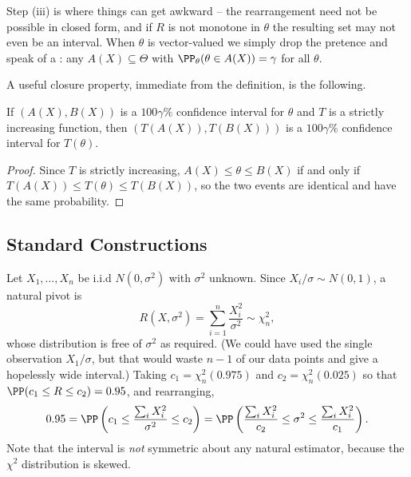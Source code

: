 Step (iii) is where things can get awkward -- the rearrangement need not be possible in closed form, and if $R$ is not monotone in $\theta$ the resulting set may not even be an interval. When $\theta$ is vector-valued we simply drop the pretence and speak of a : any $A(X) \subseteq \Theta$ with $\PP_\theta(\theta \in A(X)) = \gamma$ for all $\theta$.

A useful closure property, immediate from the definition, is the following.

\begin{proposition}
  If $(A(X), B(X))$ is a $100\gamma\%$ confidence interval for $\theta$ and $T$ is a strictly increasing function, then $\left(T(A(X)), T(B(X))\right)$ is a $100\gamma\%$ confidence interval for $T(\theta)$.
\end{proposition}
\begin{proof}
  Since $T$ is strictly increasing, $A(X) \leq \theta \leq B(X)$ if and only if $T(A(X)) \leq T(\theta) \leq T(B(X))$, so the two events are identical and have the same probability.
\end{proof}

\subsection{Standard Constructions}

\begin{example}
  Let $X_1, \dots, X_n$ be i.i.d $N(0, \sigma^2)$ with $\sigma^2$ unknown. Since $X_i/\sigma \sim N(0,1)$, a natural pivot is
  $$
  R(X, \sigma^2) = \sum_{i=1}^{n}\frac{X_i^2}{\sigma^2} \sim \chi^2_n,
  $$
  whose distribution is free of $\sigma^2$ as required. (We could have used the single observation $X_1/\sigma$, but that would waste $n - 1$ of our data points and give a hopelessly wide interval.) Taking $c_1 = \chi^2_n(0.975)$ and $c_2 = \chi^2_n(0.025)$ so that $\PP(c_1 \leq R \leq c_2) = 0.95$, and rearranging,
  $$
  0.95 = \PP\left(c_1 \leq \frac{\sum_i X_i^2}{\sigma^2} \leq c_2\right) = \PP\left(\frac{\sum_i X_i^2}{c_2} \leq \sigma^2 \leq \frac{\sum_i X_i^2}{c_1}\right).
  $$
  Note that the interval is \emph{not} symmetric about any natural estimator, because the $\chi^2$ distribution is skewed.
\end{example}


